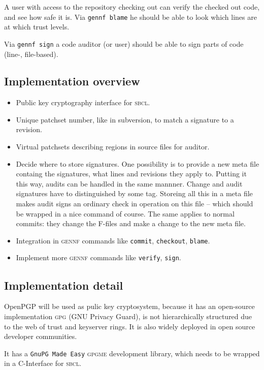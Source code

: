 \documentclass[fleqn, 10pt, a4paper]{report} \usepackage{amssymb}
\begin{document}
A user with access to the repository checking out can verify the
checked out code, and see how safe it is.  Via \texttt{gennf blame}
he should be able to look which lines are at which trust levels.

Via \texttt{gennf sign} a code auditor (or user) should be able to
sign parts of code (line-, file-based).

\subsection{Implementation overview}

\begin{itemize}
\item Public key cryptography interface for \textsc{sbcl}.
\item Unique patchset number, like in subversion, to match a signature
  to a revision.
\item Virtual patchsets describing regions in source files for
  auditor.
\item Decide where to store signatures.  One possibility is to provide a
  new meta file containg the signatures, what lines and revisions they
  apply to. Putting it this way, audits can be handled in the same
  mannner. Change and audit signatures have to distinguished by some
  tag. Storeing all this in a meta file makes audit signs an ordinary
  check in operation on this file -- which should be wrapped in a nice
  command of course. The same applies to normal commits: they change
  the F-files and make a change to the new meta file.
\item Integration in \textsc{gennf} commands like \texttt{commit},
  \texttt{checkout}, \texttt{blame}.
\item Implement more \textsc{gennf} commands like \texttt{verify},
  \texttt{sign}.
\end{itemize}

\subsection{Implementation detail}

OpenPGP will be used as pulic key cryptosystem, because it has an
open-source implementation \textsc{gpg} (GNU Privacy Guard), is not
hierarchically structured due to the web of trust and keyserver rings.
It is also widely deployed in open source developer communities.

It has a \texttt{GnuPG Made Easy} \textsc{gpgme} development library,
which needs to be wrapped in a C-Interface for \textsc{sbcl}.
\end{document}
